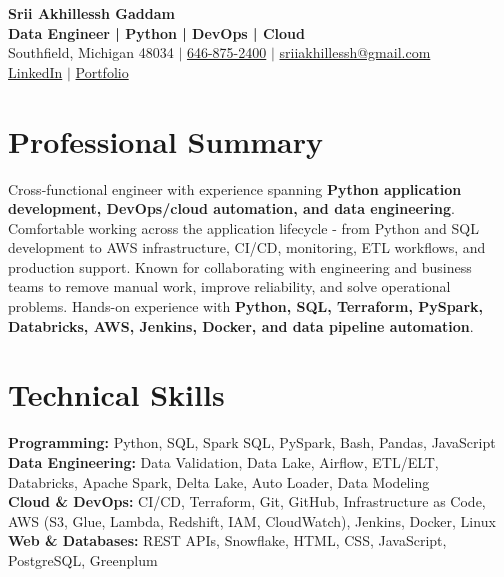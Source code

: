 \documentclass[letterpaper,10pt]{article}
\begin{document}
\fontsize{9.35pt}{10.45pt}\selectfont

\begin{center}
    {\LARGE \textbf{Srii Akhillessh Gaddam}} \\[-1pt]
    \textbf{Data Engineer | Python | DevOps | Cloud} \\[2pt]
    Southfield, Michigan 48034 $|$
    \href{tel:6468752400}{646-875-2400} $|$
    \href{mailto:sriiakhillessh@gmail.com}{sriiakhillessh@gmail.com} \\[1pt]
    \href{https://www.linkedin.com/in/srii-akhiilessh-gaddam-b48668191/}{LinkedIn} $|$
    \href{https://sriiakhillesshg.github.io/portfolio/}{Portfolio}
\end{center}
\vspace{-8pt}

\section{Professional Summary}
\small{Cross-functional engineer with experience spanning \textbf{Python application development, DevOps/cloud automation, and data engineering}. Comfortable working across the application lifecycle - from Python and SQL development to AWS infrastructure, CI/CD, monitoring, ETL workflows, and production support. Known for collaborating with engineering and business teams to remove manual work, improve reliability, and solve operational problems. Hands-on experience with \textbf{Python, SQL, Terraform, PySpark, Databricks, AWS, Jenkins, Docker, and data pipeline automation}.}

\section{Technical Skills}
\small{
\textbf{Programming:} Python, SQL, Spark SQL, PySpark, Bash, Pandas, JavaScript \\
\textbf{Data Engineering:} Data Validation, Data Lake, Airflow, ETL/ELT, Databricks, Apache Spark, Delta Lake, Auto Loader, Data Modeling \\
\textbf{Cloud \& DevOps:} CI/CD, Terraform, Git, GitHub, Infrastructure as Code, AWS (S3, Glue, Lambda, Redshift, IAM, CloudWatch), Jenkins, Docker, Linux \\
\textbf{Web \& Databases:} REST APIs, Snowflake, HTML, CSS, JavaScript, PostgreSQL, Greenplum
}
\end{document}
